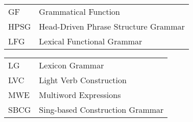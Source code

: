 \documentclass[output=paper]{langsci/langscibook}
\begin{document}
\noindent\begin{table}[H]
\begin{tabularx}{.44\textwidth}{lQ}
GF & Grammatical Function \\
HPSG & Head-Driven Phrase Structure Grammar \\
LFG & Lexical Functional Grammar 
\end{tabularx}
\begin{tabularx}{.55\textwidth}{lQ}
LG & Lexicon Grammar \\
LVC & Light Verb Construction \\
MWE & Multiword Expressions \\
SBCG & Sing-based Construction Grammar
\end{tabularx}
\end{table}



\sloppy
\printbibliography[heading=subbibliography,notkeyword=this]
\end{document}
